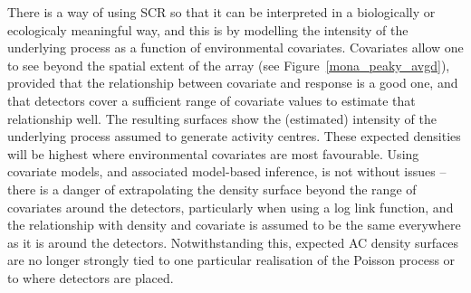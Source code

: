 \documentclass[useAMS,usenatbib,referee]{biom}
\begin{document}

There is a way of using SCR so that it can be interpreted in a biologically or ecologicaly meaningful way, and this is by modelling the intensity of the underlying process as a function of environmental covariates. Covariates allow one to see beyond the spatial extent of the array (see Figure~\ref{mona_peaky_avgd}), provided that the relationship between covariate and response is a good one, and that detectors cover a sufficient range of covariate values to estimate that relationship well. The resulting surfaces show the (estimated) intensity of the underlying process assumed to generate activity centres. These expected densities will be highest where environmental covariates are most favourable. Using covariate models, and associated model-based inference, is not without issues -- there is a danger of extrapolating the density surface beyond the range of covariates around the detectors, particularly when using a log link function, and the relationship with density and covariate is assumed to be the same everywhere as it is around the detectors. Notwithstanding this, expected AC density surfaces are no longer strongly tied to one particular realisation of the Poisson process or to where detectors are placed.

\end{document}
